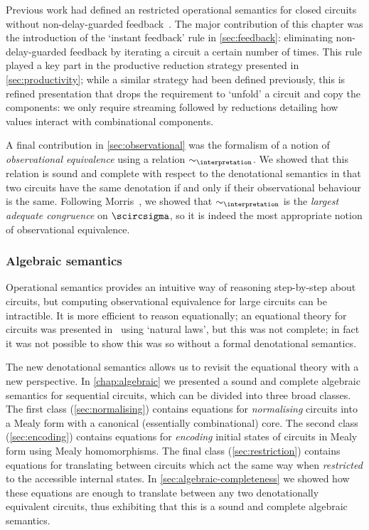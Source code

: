 Previous work had defined an restricted operational semantics for closed
circuits without non-delay-guarded feedback~\cite{ghica2017diagrammatic}.
The major contribution of this chapter was the introduction of the
`instant feedback' rule in \cref{sec:feedback}: eliminating non-delay-guarded
feedback by iterating a circuit a certain number of times.
This rule played a key part in the productive reduction strategy presented in
\cref{sec:productivity}; while a similar strategy had been defined previously,
this is refined presentation that drops the requirement
to `unfold' a circuit and copy the components: we only require streaming
followed by reductions detailing how values interact with
combinational components.

A final contribution in \cref{sec:observational} was the formalism of a notion
of \emph{observational equivalence} using a relation \(\sim_\interpretation\).
We showed that this relation is sound and complete with respect to the
denotational semantics in that two circuits have the same denotation if and only
if their observational behaviour is the same.
Following Morris~\cite{morris1969lambdacalculus,gordon1980denotational}, we
showed that \(\sim_\interpretation\) is the \emph{largest adequate congruence}
on \(\scircsigma\), so it is indeed the most appropriate notion of observational
equivalence.

\subsubsection{Algebraic semantics}

Operational semantics provides an intuitive way of reasoning step-by-step
about circuits, but computing observational equivalence for large circuits can
be intractible.
It is more efficient to reason equationally; an equational theory for circuits
was presented in~\cite{ghica2016categorical} using `natural laws', but this was
not complete; in fact it was not possible to show this was so without a formal
denotational semantics.

The new denotational semantics allows us to revisit the equational theory with
a new perspective.
In \cref{chap:algebraic} we presented a sound and complete algebraic semantics
for sequential circuits, which can be divided into three broad classes.
The first class (\cref{sec:normalising}) contains equations for
\emph{normalising} circuits into a Mealy form with a canonical (essentially
combinational) core.
The second class (\cref{sec:encoding}) contains equations for \emph{encoding}
initial states of circuits in Mealy form using Mealy homomorphisms.
The final class (\cref{sec:restriction}) contains equations for translating
between circuits which act the same way when \emph{restricted} to the
accessible internal states.
In \cref{sec:algebraic-completeness} we showed how these equations are enough to
translate between any two denotationally equivalent circuits, thus exhibiting
that this is a sound and complete algebraic semantics.

